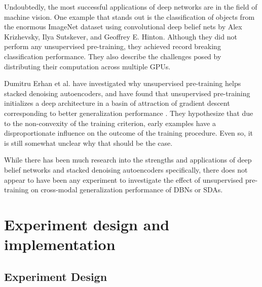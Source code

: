 \documentclass[12pt]{article}
\begin{document}
\begin{doublespacing}
Undoubtedly, the most successful applications of deep networks are in the field of machine vision. One example that stands out is the classification of objects from the enormous ImageNet dataset using convolutional deep belief nets by Alex Krizhevsky, Ilya Sutskever, and Geoffrey E. Hinton\cite{krizhevsky2012imagenet, imagenet_cvpr09}. Although they did not perform any unsupervised pre-training, they achieved record breaking classification performance. They also describe the challenges posed by distributing their computation across multiple GPUs.

Dumitru Erhan et al. have investigated why unsupervised pre-training helps stacked denoising autoencoders, and have found that unsupervised pre-training initializes a deep architecture in a basin of attraction of gradient descent corresponding to better generalization performance \cite{erhan2010does}. They hypothesize that due to the non-convexity of the training criterion, early examples have a disproportionate influence on the outcome of the training procedure. Even so, it is still somewhat unclear why that should be the case. 

While there has been much research into the strengths and applications of deep belief networks and stacked denoising autoencoders specifically, there does not appear to have been any experiment to investigate the effect of unsupervised pre-training on cross-modal generalization performance of DBNs or SDAs.

	
\section{Experiment design and implementation}

	\subsection{Experiment Design}
	

\end{doublespacing}
\end{document}
